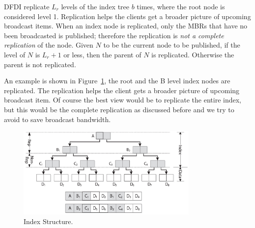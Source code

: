 DFDI replicate $L_r$ levels of the index tree $b$ times, where the
root node is considered level 1. Replication helps the clients get
a broader picture of upcoming broadcast items. When an index node
is replicated, only the MBRs that have no been broadcasted is
published; therefore the replication is \emph{not a complete
replication} of the node. Given $N$ to be the current node to be
published, if the level of $N$ is $L_r + 1$ or less, then the
parent of $N$ is replicated. Otherwise the parent is not
replicated.

An example is shown in Figure~\ref{fig:index_struct}, the root and
the B level index nodes are replicated. The replication helps the
client gets a broader picture of upcoming broadcast item. Of
course the best view would be to replicate the entire index, but
this would be the complete replication as discussed before and we
try to avoid to save broadcast bandwidth.
%

\begin{figure}[h]
\begin{center}
\includegraphics[width=3.5in]{Figures/bcast_struct.eps}
\caption{\small Index Structure. \label{fig:index_struct}}
\end{center}
\end{figure}

